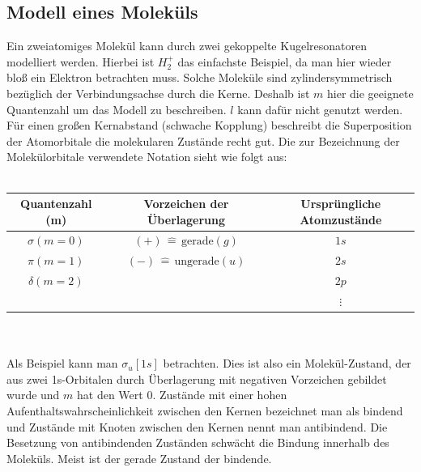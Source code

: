 \documentclass[german,  %
parskip=full,  %
]{scrartcl}
\begin{document}
\subsection{Modell eines Moleküls}
Ein zweiatomiges Molekül kann durch zwei gekoppelte Kugelresonatoren modelliert werden. Hierbei ist $H^{+}_{2}$ das einfachste Beispiel, da man hier wieder bloß ein Elektron betrachten muss. Solche Moleküle sind zylindersymmetrisch bezüglich der Verbindungsachse durch die Kerne. Deshalb ist $m$ hier die geeignete Quantenzahl um das Modell zu beschreiben.  $l$ kann dafür nicht genutzt werden. Für einen großen Kernabstand (schwache Kopplung) beschreibt die Superposition der Atomorbitale die molekularen Zustände recht gut. Die zur Bezeichnung der Molekülorbitale verwendete Notation sieht wie folgt aus: \\\\
\begin{table}[h!] \centering
\begin{tabular}{|c|c|c|} \hline
Quantenzahl (m) & Vorzeichen der Überlagerung & Ursprüngliche Atomzustände \\ \hline
$\sigma (m=0)$ & $(+) \, \hat{=} \, \text{gerade} (g)$ & $1s$ \\ \hline
$\pi (m=1) $ & $(-) \, \hat{=} \, \text{ungerade}(u)$ & $2s$\\ \hline
$\delta (m=2)$ &  & $2p$ \\ \hline
 &  &  $\vdots$ \\ \hline
\end{tabular}
\end{table} \\\\
Als Beispiel kann man $\sigma_{u}[1s]$ betrachten. Dies ist also ein Molekül-Zustand, der aus zwei 1s-Orbitalen durch Überlagerung mit negativen Vorzeichen gebildet wurde und $m$ hat den Wert 0. Zustände mit einer hohen Aufenthaltswahrscheinlichkeit zwischen den Kernen bezeichnet man als bindend und Zustände mit Knoten zwischen den Kernen nennt man antibindend. Die Besetzung von antibindenden Zuständen schwächt die Bindung innerhalb des Moleküls. Meist ist der gerade Zustand der bindende.
\end{document}
